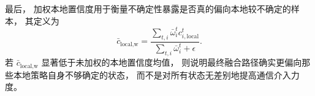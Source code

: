 最后，
加权本地置信度用于衡量不确定性暴露是否真的偏向本地较不确定的样本，
其定义为
\begin{equation}
\bar{c}_{\text{local,w}}
=
\frac{
\sum_{t,i}
\bar{\omega}_i^t
c_{i,\text{local}}^t
}{
\sum_{t,i}\bar{\omega}_i^t + \epsilon
}.
\end{equation}
若 \(\bar{c}_{\text{local,w}}\) 显著低于未加权的本地置信度均值，
则说明最终融合路径确实更偏向那些本地策略自身不够确定的状态，
而不是对所有状态无差别地提高通信介入力度。